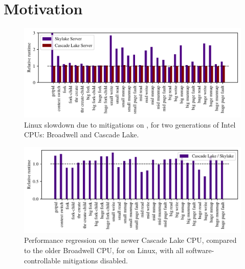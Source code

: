 \section{Motivation}
\label{s:motivation}

\begin{figure}[t]
  \begin{center}
    \includegraphics{results/bhw2_bhw3_overhead}
  \end{center}
\vspace{-\baselineskip}
\caption{Linux slowdown due to mitigations on \bench, for two generations of Intel CPUs: Broadwell and Cascade Lake.}
\label{fig:linuxslowdown}
\end{figure}

\begin{figure}[t]
  \begin{center}
    \includegraphics{results/cascade_lake_regression}
  \end{center}
\vspace{-\baselineskip}
\caption{Performance regression on the newer Cascade Lake CPU, compared to the older Broadwell CPU,
  for \bench on Linux, with all software-controllable mitigations disabled.}
\label{fig:regression}
\end{figure}

